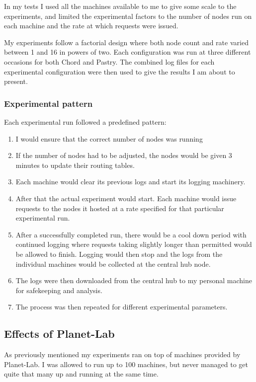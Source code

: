 In my tests I used all the machines available to me to give some scale to the experiments, and limited the experimental factors to the number of nodes run on each machine and the rate at which requests were issued.

My experiments follow a factorial design where both node count and rate varied between 1 and 16 in powers of two. Each configuration was run at three different occasions for both Chord and Pastry. The combined log files for each experimental configuration were then used to give the results I am about to present.

\subsubsection{Experimental pattern}
Each experimental run followed a predefined pattern:
\begin{enumerate}
\item I would ensure that the correct number of nodes was running
\item If the number of nodes had to be adjusted, the nodes would be given 3 minutes to update their routing tables.
\item Each machine would clear its previous logs and start its logging machinery.
\item After that the actual experiment would start. Each machine would issue requests to the nodes it hosted at a rate specified for that particular experimental run.
\item After a successfully completed run, there would be a cool down period with continued logging where requests taking slightly longer than permitted would be allowed to finish. Logging would then stop and the logs from the individual machines would be collected at the central hub node.
\item The logs were then downloaded from the central hub to my personal machine for safekeeping and analysis.
\item The process was then repeated for different experimental parameters.
\end{enumerate}

\subsection{Effects of Planet-Lab}
As previously mentioned my experiments ran on top of machines provided by Planet-Lab. I was allowed to run up to 100 machines, but never managed to get quite that many up and running at the same time.

